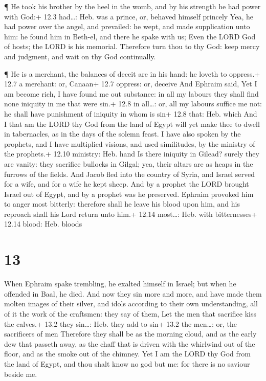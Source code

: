  ¶ He took his brother by the heel in the womb, and by his
strength he had power with God:+ 12.3 had\ldots: Heb. was a prince, or,
behaved himself princely  Yea, he had power over the angel,
and prevailed: he wept, and made supplication unto him: he found him in
Beth-el, and there he spake with us;  Even the LORD God of
hosts; the LORD is his memorial.  Therefore turn thou to thy
God: keep mercy and judgment, and wait on thy God continually.

 ¶ He is a merchant, the balances of deceit are in his hand:
he loveth to oppress.+ 12.7 a merchant: or, Canaan+ 12.7 oppress: or,
deceive  And Ephraim said, Yet I am become rich, I have
found me out substance: in all my labours they shall find none iniquity
in me that were sin.+ 12.8 in all\ldots: or, all my labours suffice me
not: he shall have punishment of iniquity in whom is sin+ 12.8 that:
Heb. which  And I that am the LORD thy God from the land of
Egypt will yet make thee to dwell in tabernacles, as in the days of the
solemn feast.  I have also spoken by the prophets, and I
have multiplied visions, and used similitudes, by the ministry of the
prophets.+ 12.10 ministry: Heb. hand  Is there iniquity in
Gilead? surely they are vanity: they sacrifice bullocks in Gilgal; yea,
their altars are as heaps in the furrows of the fields. 
And Jacob fled into the country of Syria, and Israel served for a wife,
and for a wife he kept sheep.  And by a prophet the LORD
brought Israel out of Egypt, and by a prophet was he preserved.
 Ephraim provoked him to anger most bitterly: therefore
shall he leave his blood upon him, and his reproach shall his Lord
return unto him.+ 12.14 most\ldots: Heb. with bitternesses+ 12.14 blood:
Heb. bloods

\hypertarget{section-12}{%
\section{13}\label{section-12}}

 When Ephraim spake trembling, he exalted himself in Israel;
but when he offended in Baal, he died.  And now they sin
more and more, and have made them molten images of their silver, and
idols according to their own understanding, all of it the work of the
craftsmen: they say of them, Let the men that sacrifice kiss the
calves.+ 13.2 they sin\ldots: Heb. they add to sin+ 13.2 the men\ldots:
or, the sacrificers of men  Therefore they shall be as the
morning cloud, and as the early dew that passeth away, as the chaff that
is driven with the whirlwind out of the floor, and as the smoke out of
the chimney.  Yet I am the LORD thy God from the land of
Egypt, and thou shalt know no god but me: for there is no saviour beside
me.

